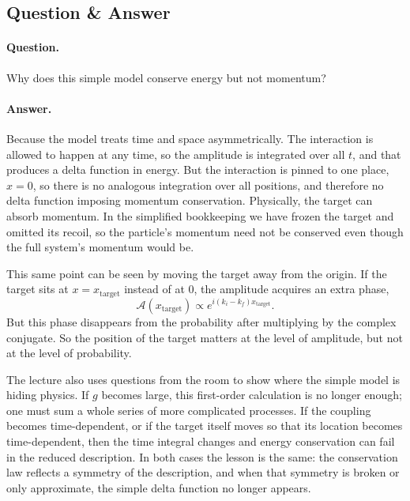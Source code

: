 \subsection{Question \& Answer}

\paragraph{Question.} Why does this simple model conserve energy but not momentum?

\paragraph{Answer.} Because the model treats time and space asymmetrically. The interaction is allowed to happen at any time, so the amplitude is integrated over all \(t\), and that produces a delta function in energy. But the interaction is pinned to one place, \(x=0\), so there is no analogous integration over all positions, and therefore no delta function imposing momentum conservation. Physically, the target can absorb momentum. In the simplified bookkeeping we have frozen the target and omitted its recoil, so the particle's momentum need not be conserved even though the full system's momentum would be.

This same point can be seen by moving the target away from the origin. If the target sits at \(x=x_{\text{target}}\) instead of at \(0\), the amplitude acquires an extra phase,
\begin{equation}
\mathcal A(x_{\text{target}})\propto e^{i(k_i-k_f)x_{\text{target}}}.
\end{equation}
But this phase disappears from the probability after multiplying by the complex conjugate. So the position of the target matters at the level of amplitude, but not at the level of probability.

The lecture also uses questions from the room to show where the simple model is hiding physics. If \(g\) becomes large, this first-order calculation is no longer enough; one must sum a whole series of more complicated processes. If the coupling becomes time-dependent, or if the target itself moves so that its location becomes time-dependent, then the time integral changes and energy conservation can fail in the reduced description. In both cases the lesson is the same: the conservation law reflects a symmetry of the description, and when that symmetry is broken or only approximate, the simple delta function no longer appears.

